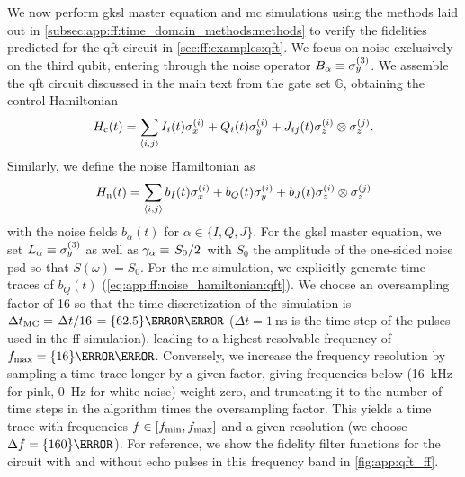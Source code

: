 We now perform \gls{gksl} master equation and \gls{mc} simulations using the methods laid out in \cref{subsec:app:ff:time_domain_methods:methods} to verify the fidelities predicted for the \gls{qft} circuit in \cref{sec:ff:examples:qft}.
We focus on noise exclusively on the third qubit, entering through the noise operator $B_\alpha\equiv\sigma_y^{(3)}$.
We assemble the \gls{qft} circuit discussed in the main text from the gate set $\mathbb{G}$, obtaining the control Hamiltonian
\begin{equation}\label{eq:app:ff:control_hamiltonian:qft}
    H_{\mathrm{c}}(t) = \sum_{\langle i,j\rangle} I_i(t)\sigma_x^{(i)} + Q_i(t)\sigma_y^{(i)} + J_{ij}(t)\sigma_z^{(i)}\otimes\sigma_z^{(j)}.
\end{equation}
Similarly, we define the noise Hamiltonian as
\begin{equation}\label{eq:app:ff:noise_hamiltonian:qft}
    H_{\mathrm{n}}(t) = \sum_{\langle i,j\rangle} b_{I}(t)\sigma_x^{(i)} + b_{Q}(t)\sigma_y^{(i)} + b_{J}(t)\sigma_z^{(i)}\otimes\sigma_z^{(j)}
\end{equation}
with the noise fields $b_{\alpha}(t)$ for $\alpha\in\{I,Q,J\}$.
For the \gls{gksl} master equation, we set $L_\alpha\equiv\sigma_y^{(3)}$ as well as $\gamma_\alpha\equiv\flatfrac{S_0}{2}$ with $S_0$ the amplitude of the one-sided noise \gls{psd} so that $S(\omega) = S_0$.
For the \gls{mc} simulation, we explicitly generate time traces of $b_Q(t)$ (\cf \cref{eq:app:ff:noise_hamiltonian:qft}).
We choose an oversampling factor of 16 so that the time discretization of the simulation is $\Delta t_\mr{MC} = \flatfrac{\Delta t}{16} = \qty{62.5}{\pico\second}$ ($\Delta t = \qty{1}{\nano\second}$ is the time step of the pulses used in the \gls{ff} simulation), leading to a highest resolvable frequency of $\fmax = \qty{16}{\giga\hertz}$.
Conversely, we increase the frequency resolution by sampling a time trace longer by a given factor, giving frequencies below \fmin (\qty{16}{\kilo\hertz} for pink, \qty{0}{\hertz} for white noise) weight zero, and truncating it to the number of time steps in the algorithm times the oversampling factor.
This yields a time trace with frequencies $f\in [f_{\mathrm{min}}, f_{\mathrm{max}}]$ and a given resolution (we choose $\df = \qty{160}{\hertz}$).
For reference, we show the fidelity filter functions for the circuit with and without echo pulses in this frequency band in \cref{fig:app:qft_ff}.

